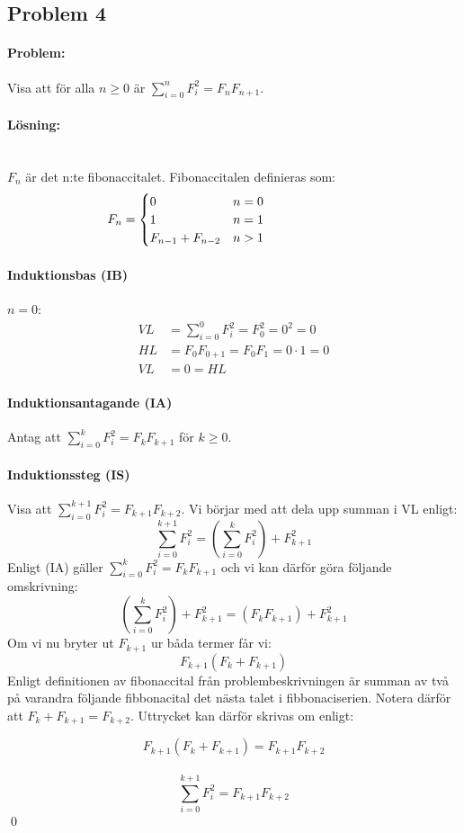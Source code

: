 \subsection*{Problem 4}

\paragraph{Problem:} Visa att för alla $n\ge 0$ är \(\sum_{i=0}^nF_i^2=F_nF_{n+1}\).

\paragraph{Lösning:}\\
$F_n$ är det n:te fibonaccitalet. Fibonaccitalen definieras som:
\begin{equation*}
\hspace{-75pt}
F_n=
    \begin{cases}
        0 & n=0\\
        1 &  n=1\\
        F_{n-1}+F_{n-2} & n> 1
    \end{cases}
\end{equation*}

\paragraph{Induktionsbas (IB)} $n=0$:
\begin{align*}
VL &= \sum_{i=0}^0F_i^2 = F_0^2 = 0^2 = 0 \\[5pt]
HL &= F_{0}F_{0+1} = F_0F_1 = 0\cdot1 = 0 \\[10pt]
VL &= 0 = HL
\end{align*}

\paragraph{Induktionsantagande (IA)} Antag att \(\sum_{i=0}^kF_i^2=F_kF_{k+1}\) för $k \ge0$.

\paragraph{Induktionssteg (IS)} Visa att \(\sum_{i=0}^{k+1}F_i^2=F_{k+1}F_{k+2}\).\newline
Vi börjar med att dela upp summan i VL enligt:
\[\sum_{i=0}^{k+1}F_i^2 = (\sum_{i=0}^{k}F_i^2) + F_{k+1}^2\]
Enligt (IA) gäller \(\sum_{i=0}^{k}F_i^2 = F_kF_{k+1}\) och vi kan därför göra följande omskrivning:
\[(\sum_{i=0}^{k}F_i^2) + F_{k+1}^2 = (F_kF_{k+1})+F_{k+1}^2\]
Om vi nu bryter ut $F_{k+1}$ ur båda termer får vi:
\[F_{k+1}(F_k+F_{k+1})\]
Enligt definitionen av fibonaccital från problembeskrivningen är summan av två på varandra följande fibbonacital det nästa talet i fibbonaciserien. Notera därför att $F_k+F_{k+1} = F_{k+2}$. Uttrycket kan därför skrivas om enligt:

\[F_{k+1}(F_k+F_{k+1}) = F_{k+1}F_{k+2} \]
\\[10pt]
\[\sum_{i=0}^{k+1}F_i^2 = F_{k+1}F_{k+2}\]
\hfill\qed